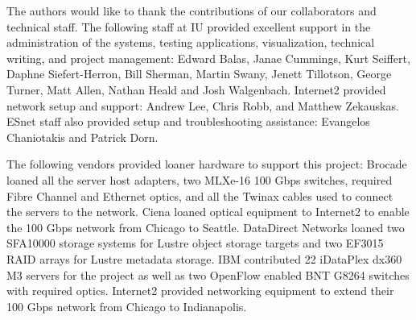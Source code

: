 \documentclass[]{sigplan-proc}
\begin{document}
The authors would like to thank the contributions of our collaborators and technical staff. The following
staff at IU provided excellent support in the administration of the systems, testing applications,
visualization, technical writing, and project management: Edward Balas, Janae Cummings, Kurt Seiffert, Daphne
Siefert-Herron, Bill Sherman, Martin Swany, Jenett Tillotson, George Turner, Matt Allen, Nathan Heald and Josh Walgenbach. Internet2 provided network setup and support: Andrew Lee, Chris Robb, and Matthew Zekauskas. ESnet staff also provided setup and troubleshooting assistance: Evangelos Chaniotakis and Patrick Dorn.

The following vendors provided loaner hardware to support this project: Brocade loaned all the server host
adapters, two MLXe-16 100 Gbps switches, required Fibre Channel and Ethernet optics, and all the Twinax cables
used to connect the servers to the network. Ciena loaned optical equipment to Internet2 to enable the 100 Gbps
network from Chicago to Seattle. DataDirect Networks loaned two SFA10000 storage systems for Lustre object
storage targets and two EF3015 RAID arrays for Lustre metadata storage. IBM contributed 22 iDataPlex dx360 M3
servers for the project as well as two OpenFlow enabled BNT G8264 switches with required optics. Internet2
provided networking equipment to extend their 100 Gbps network from Chicago to Indianapolis.



\end{document}
